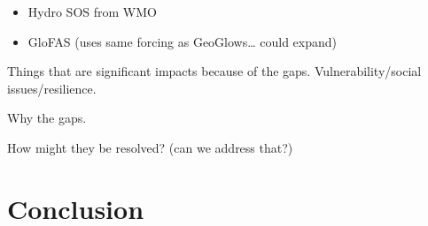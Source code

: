 \documentclass[preprint,12pt,authoryear]{elsarticle}
\begin{document}
\begin{itemize}
\item Hydro SOS from WMO
\item GloFAS (uses same forcing as GeoGlows\ldots{} could expand)
\end{itemize}

Things that are significant impacts because of the gaps. Vulnerability/social issues/resilience.

Why the gaps.

How might they be resolved? (can we address that?)

\section{Conclusion}
\label{sec:conclusion}



\end{document}
